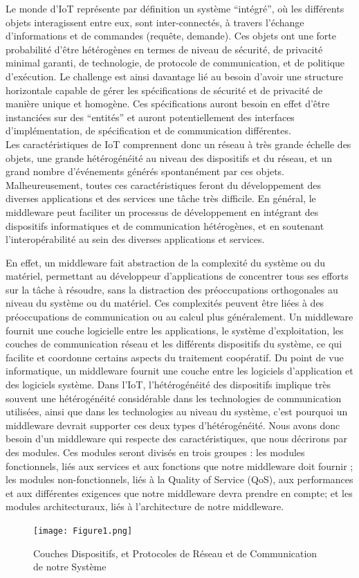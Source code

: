 Le monde d’IoT représente par définition un système “intégré”, où les différents objets interagissent entre eux, sont
inter-connectés, à travers l’échange d’informations et de commandes (requête, demande). Ces objets ont une forte probabilité d’être hétérogènes en termes de niveau de sécurité, de privacité minimal garanti, de technologie, de protocole de communication, et de politique d’exécution. Le challenge est ainsi davantage lié au besoin d’avoir une structure horizontale capable de gérer les spécifications de sécurité et de privacité de manière unique et homogène. Ces spécifications auront besoin en effet d’être instanciées sur des “entités” et auront potentiellement des interfaces d’implémentation, de spécification et de communication différentes.
\\

Les caractéristiques de IoT comprennent donc un réseau à très grande échelle des objets, une grande hétérogénéité au niveau des dispositifs et du réseau, et un grand nombre d'événements générés spontanément par ces objets. Malheureusement, toutes ces caractéristiques feront du développement des diverses applications et des services une tâche très difficile. En général, le middleware peut faciliter un processus de développement en intégrant des dispositifs informatiques et de communication hétérogènes, et en soutenant l'interopérabilité au sein des diverses applications et services.

En effet, un middleware fait abstraction de la complexité du système ou du matériel, permettant au développeur d'applications de concentrer tous ses efforts sur la tâche à résoudre, sans la distraction des préoccupations orthogonales au niveau du système ou du matériel. Ces complexités peuvent être liées à des préoccupations de communication ou au calcul plus généralement. Un middleware fournit une couche logicielle entre les applications, le système d'exploitation, les couches de communication réseau et les différents dispositifs du système, ce qui facilite et coordonne certains aspects du traitement coopératif. Du point de vue informatique, un middleware fournit une couche entre les logiciels d'application et des logiciels système. Dans l'IoT, l’hétérogénéité des dispositifs implique très souvent une hétérogénéité considérable dans les technologies de communication utilisées, ainsi que dans les technologies au niveau du système, c’est pourquoi un middleware devrait supporter ces deux types d’hétérogénéité. Nous avons donc besoin d’un middleware qui respecte des caractéristiques, que nous décrirons par des modules. Ces modules seront divisés en trois groupes : les modules fonctionnels, liés aux services et aux fonctions que notre middleware doit fournir ; les modules non-fonctionnels, liés à la Quality of Service (QoS), aux performances et aux différentes exigences que notre middleware devra prendre en compte; et les modules architecturaux, liés à l’architecture de notre middleware.
\\
\begin{figure}[h!]
	\hspace*{-1cm}
	\centering
	\texttt{[image: Figure1.png]}
	\caption{Couches Dispositifs, et Protocoles de Réseau et de Communication de notre Système}
	\label{fig:couches}
\end{figure}

